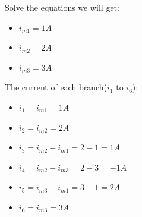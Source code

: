 \documentclass[a4 paper]{article}
\numberwithin{equation}{section}
\newcommand{\0}{\mathbf{0}}
\begin{document}
Solve the equations we will get:


\begin{itemize} \itemsep3pt \parskip0pt  
  \item[] \hspace{6.6 cm}$i_{m1} = 1A$
  \item[] \hspace{6.6 cm}$i_{m2} = 2A$
  \item[] \hspace{6.6 cm}$i_{m3} = 3A$
\end{itemize}

The current of each branch($i_1$ to $i_6$):


\begin{itemize} \itemsep3pt \parskip0pt  
  \item[] \hspace{6.6 cm}$i_1 = i_{m1} = 1A$
  \item[] \hspace{6.6 cm}$i_2 = i_{m2} = 2A$
  \item[] \hspace{6.6 cm}$i_3 = i_{m2} - i_{m1} = 2-1 = 1A$
  \item[] \hspace{6.6 cm}$i_4 = i_{m2} - i_{m3} = 2-3 = -1A$
  \item[] \hspace{6.6 cm}$i_5 = i_{m3} - i_{m1} = 3-1 = 2A$
  \item[] \hspace{6.6 cm}$i_6 = i_{m3} = 3A$
\end{itemize}




































%
%
\end{document}

